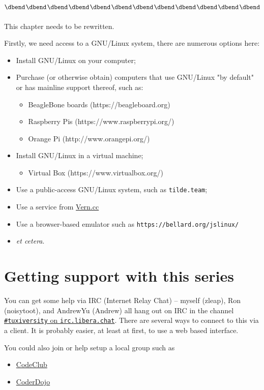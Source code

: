 \documentclass{extbook}
\newcommand\libera[1]{\href{https://web.libera.chat/?channel=\##1}{\texttt{\##1} on \texttt{irc.libera.chat}}}
\begin{document}
$$\vcenter{\hbox{\dbend\kern1pt\dbend\kern1pt\dbend\kern1pt\dbend\kern1pt\dbend\kern1pt\dbend\kern1pt\dbend\kern1pt\dbend\kern1pt\dbend\kern1pt\dbend\kern1pt\dbend\kern1pt\dbend}\vskip 11pt}$$
This chapter needs to be rewritten.

Firstly, we need access to a GNU/Linux system, there are numerous options here:

\begin{itemize}
\item Install GNU/Linux on your computer;
\item Purchase (or otherwise obtain) computers that use GNU/Linux "by default" or has mainline support thereof, such as:
  \begin{itemize}
  \item BeagleBone boards (https://beagleboard.org)
  \item Raspberry Pis (https://www.raspberrypi.org/)
  \item Orange Pi (http://www.orangepi.org/)
  \end{itemize}
\item Install GNU/Linux in a virtual machine;
  \begin{itemize}
  \item Virtual Box (https://www.virtualbox.org/)
  \end{itemize}
\item Use a public-access GNU/Linux system, such as \texttt{tilde.team};
\item Use a service from \href{https://www.vern.cc}{Vern.cc}
\item Use a browser-based emulator such as \texttt{https://bellard.org/jslinux/}
\item \textit{et cetera}.
\end{itemize}

\chapter{Getting support with this series}

You can get some help via IRC (Internet Relay Chat) -- myself (zleap), Ron (noisytoot), and AndrewYu (Andrew) all hang out on IRC in the channel \libera{tuxiversity}. There are several ways to connect to this via a client. It is probably easier, at least at first, to use a web based interface.

You could also join or help setup a local group such as

\begin{itemize}
\item \href{https://www.codeclub.org.uk}{CodeClub}
\item \href{https://coderdojo.com/}{CoderDojo}
\end{itemize}
\end{document}
